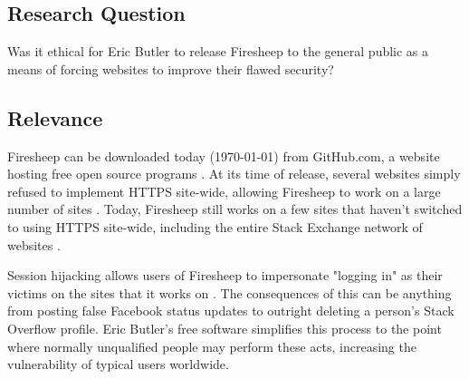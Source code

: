 \documentclass[11pt]{article}
\begin{document}
\begin{multicols}{2}

\section{Research Question}


Was it ethical for Eric Butler to release Firesheep to the general public as a means of forcing websites to improve their flawed security?

\subsection{Relevance}
Firesheep can be downloaded today ({\today}) from GitHub.com, a website hosting free open source programs \cite{firesheep-source}. At its time of release, several websites simply refused to implement HTTPS site-wide, allowing Firesheep to work on a large number of sites \cite{eric-butler}. Today, Firesheep still works on a few sites that haven't switched to using HTTPS site-wide, including the entire Stack Exchange network of websites \cite{stack-exchange}.

Session hijacking allows users of Firesheep to impersonate "logging in" as their victims on the sites that it works on \cite{eric-butler}. The consequences of this can be anything from posting false Facebook status updates to outright deleting a person's Stack Overflow profile. Eric Butler's free software simplifies this process to the point where normally unqualified people may perform these acts, increasing the vulnerability of typical users worldwide.



\end{multicols}
\end{document}
